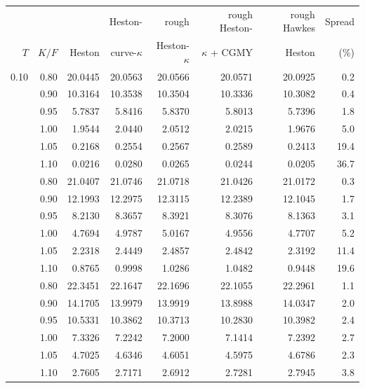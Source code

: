 \begin{tabular}{rrrrrrrr}
\toprule
 &  &  & Heston- & rough & rough Heston- & rough Hawkes & Spread\\
$T$ & $K/F$ & Heston & curve-$\kappa$ & Heston-$\kappa$ & $\kappa$ + CGMY & Heston & (\%)\\
\midrule
0.10 & 0.80 & 20.0445 & 20.0563 & 20.0566 & 20.0571 & 20.0925 & 0.2\\
 & 0.90 & 10.3164 & 10.3538 & 10.3504 & 10.3336 & 10.3082 & 0.4\\
 & 0.95 & 5.7837 & 5.8416 & 5.8370 & 5.8013 & 5.7396 & 1.8\\
 & 1.00 & 1.9544 & 2.0440 & 2.0512 & 2.0215 & 1.9676 & 5.0\\
 & 1.05 & 0.2168 & 0.2554 & 0.2567 & 0.2589 & 0.2413 & 19.4\\
 & 1.10 & 0.0216 & 0.0280 & 0.0265 & 0.0244 & 0.0205 & 36.7\\
\addlinespace
0.50 & 0.80 & 21.0407 & 21.0746 & 21.0718 & 21.0426 & 21.0172 & 0.3\\
 & 0.90 & 12.1993 & 12.2975 & 12.3115 & 12.2389 & 12.1045 & 1.7\\
 & 0.95 & 8.2130 & 8.3657 & 8.3921 & 8.3076 & 8.1363 & 3.1\\
 & 1.00 & 4.7694 & 4.9787 & 5.0167 & 4.9556 & 4.7707 & 5.2\\
 & 1.05 & 2.2318 & 2.4449 & 2.4857 & 2.4842 & 2.3192 & 11.4\\
 & 1.10 & 0.8765 & 0.9998 & 1.0286 & 1.0482 & 0.9448 & 19.6\\
\addlinespace
1.00 & 0.80 & 22.3451 & 22.1647 & 22.1696 & 22.1055 & 22.2961 & 1.1\\
 & 0.90 & 14.1705 & 13.9979 & 13.9919 & 13.8988 & 14.0347 & 2.0\\
 & 0.95 & 10.5331 & 10.3862 & 10.3713 & 10.2830 & 10.3982 & 2.4\\
 & 1.00 & 7.3326 & 7.2242 & 7.2000 & 7.1414 & 7.2392 & 2.7\\
 & 1.05 & 4.7025 & 4.6346 & 4.6051 & 4.5975 & 4.6786 & 2.3\\
 & 1.10 & 2.7605 & 2.7171 & 2.6912 & 2.7281 & 2.7945 & 3.8\\
\bottomrule
\end{tabular}
